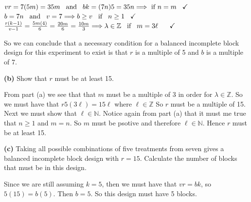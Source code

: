 \documentclass[12pt,]{article}
\begin{document}
\begin{center}
$vr = 7(5m) = 35m  \hspace{.3cm} \text{and} \hspace{.3cm} bk = (7n)5 = 35n \Longrightarrow \text{ if } n=m \hspace{.3cm}  \checkmark$\\
$b= 7n \hspace{.3cm} \text{and} \hspace{.3cm}  v=7 \Longrightarrow b \geq v \hspace{.3cm} \text{if} \hspace{.3cm} n \geq 1 \hspace{.3cm}  \checkmark$\\
$\frac{r(k-1)}{v-1} = \frac{5m(4)}{6} = \frac{20m}{6} = \frac{10m}{3}  
 \Longrightarrow  \lambda  \in \mathbb{Z} \hspace{.3cm} \text{if} \hspace{.3cm} m = 3\ell  \hspace{.3cm} \hspace{.3cm}  \checkmark$
\end{center}

So we can conclude that a necessary condition for a balanced incomplete
block design for this experiment to exist is that \(r\) is a multiple of
5 and \(b\) is a multiple of 7.

\textbf{(b)} Show that \(r\) must be at least 15.

From part (a) we see that that \(m\) must be a multiple of 3 in order
for \(\lambda \in \mathbb{Z}\). So we must have that
\(r5 (3\ell) = 15 \ell\) where \(\ell \in \mathbb{Z}\) So \(r\) must be
a multiple of 15. Next we must show that \(\ell \in \mathbb{N}\). Notice
again from part (a) that it must me true that \(n \geq1\) and \(m=n\).
So \(m\) must be psotive and therefore \(\ell \in \mathbb{N}\). Hence
\(r\) must be at least 15.

\textbf{(c)} Taking all possible combinations of five treatments from
seven gives a balanced incomplete block design with \(r = 15\).
Calculate the number of blocks that must be in this design.

Since we are still assuming \(k=5\), then we must have that \(vr = bk\),
so \(5(15) = b (5)\). Then \(b=5\). So this design must have 5 blocks.
\end{document}
